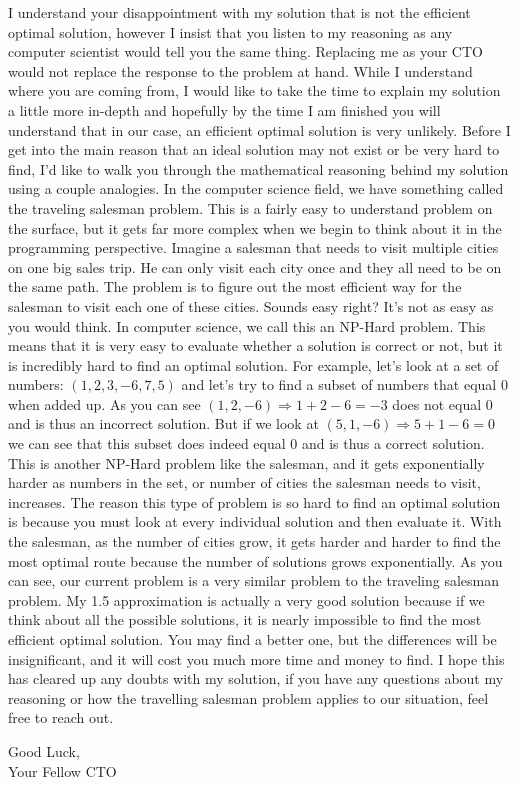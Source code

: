 \documentclass[12pt]{article}
\begin{document}
I understand your disappointment with my solution that is not the efficient optimal solution, however I insist that you listen to my reasoning as any computer scientist would tell you the same thing. Replacing me as your CTO would not replace the response to the problem at hand. While I understand where you are coming from, I would like to take the time to explain my solution a little more in-depth and hopefully by the time I am finished you will understand that in our case, an efficient optimal solution is very unlikely. Before I get into the main reason that an ideal solution may not exist or be very hard to find, I'd like to walk you through the mathematical reasoning behind my solution using a couple analogies. In the computer science field, we have something called the traveling salesman problem. This is a fairly easy to understand problem on the surface, but it gets far more complex when we begin to think about it in the programming perspective. Imagine a salesman that needs to visit multiple cities on one big sales trip. He can only visit each city once and they all need to be on the same path. The problem is to figure out the most efficient way for the salesman to visit each one of these cities. Sounds easy right? It's not as easy as you would think. In computer science, we call this an NP-Hard problem. This means that it is very easy to evaluate whether a solution is correct or not, but it is incredibly hard to find an optimal solution. For example, let’s look at a set of numbers: $(1,2,3,-6,7,5)$ and let’s try to find a subset of numbers that equal 0 when added up. As you can see $(1,2,-6) \Rightarrow 1+2-6 = -3$ does not equal 0 and is thus an incorrect solution. But if we look at $(5,1,-6) \Rightarrow 5+1-6 = 0$ we can see that this subset does indeed equal 0 and is thus a correct solution. This is another NP-Hard problem like the salesman, and it gets exponentially harder as numbers in the set, or number of cities the salesman needs to visit, increases. The reason this type of problem is so hard to find an optimal solution is because you must look at every individual solution and then evaluate it. With the salesman, as the number of cities grow, it gets harder and harder to find the most optimal route because the number of solutions grows exponentially. As you can see, our current problem is a very similar problem to the traveling salesman problem. My 1.5 approximation is actually a very good solution because if we think about all the possible solutions, it is nearly impossible to find the most efficient optimal solution. You may find a better one, but the differences will be insignificant, and it will cost you much more time and money to find. I hope this has cleared up any doubts with my solution, if you have any questions about my reasoning or how the travelling salesman problem applies to our situation, feel free to reach out. 

Good Luck,
\\ Your Fellow CTO 


\newpage
\pagebreak
\end{document}
